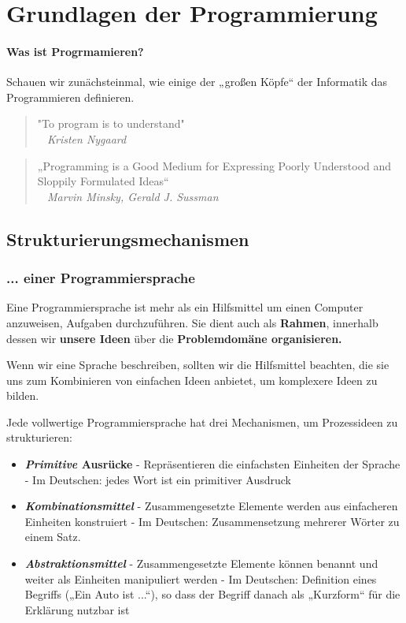 
\chapter{Grundlagen der Programmierung}
\label{c:grundlagen}
\setcounter{page}{1}
\subsubsection{Was ist Progrmamieren?}

Schauen wir zunächsteinmal, wie einige der „großen Köpfe“ der
Informatik das Programmieren definieren.

\begin{quote}
	"To program is to understand" \\
	\textit{~ Kristen Nygaard}
\end{quote}

\begin{quote}
	„Programming is a Good Medium for Expressing Poorly
	Understood and Sloppily Formulated Ideas“\\
	\textit{~ Marvin Minsky, Gerald J. Sussman}
\end{quote}

\section{Strukturierungsmechanismen}

\subsection{... einer Programmiersprache}

Eine Programmiersprache ist mehr als ein Hilfsmittel um einen
Computer anzuweisen, Aufgaben durchzuführen.
Sie dient auch als \textbf{Rahmen}, innerhalb dessen wir \textbf{unsere
Ideen} über die \textbf{Problemdomäne organisieren.}

Wenn wir eine Sprache beschreiben, sollten wir
die Hilfsmittel beachten, die sie uns zum
Kombinieren von einfachen Ideen anbietet, um
komplexere Ideen zu bilden.

Jede vollwertige Programmiersprache hat drei Mechanismen,
um Prozessideen zu strukturieren:

\begin{itemize}
	\item \textbf{\textit{Primitive} Ausrücke}
		\subitem - Repräsentieren die einfachsten Einheiten der Sprache
		\subitem - Im Deutschen: jedes Wort ist ein primitiver Ausdruck
	\item \textbf{\textit{Kombinationsmittel}}
		\subitem - Zusammengesetzte Elemente werden aus einfacheren Einheiten
		konstruiert
		\subitem - Im Deutschen: Zusammensetzung mehrerer Wörter zu einem Satz.
	\item \textbf{\textit{Abstraktionsmittel}}
		\subitem - Zusammengesetzte Elemente können benannt und weiter als Einheiten manipuliert werden
		\subitem - Im Deutschen: Definition eines Begriffs („Ein Auto ist ...“), so dass der Begriff danach als „Kurzform“ für die Erklärung nutzbar ist
\end{itemize}

